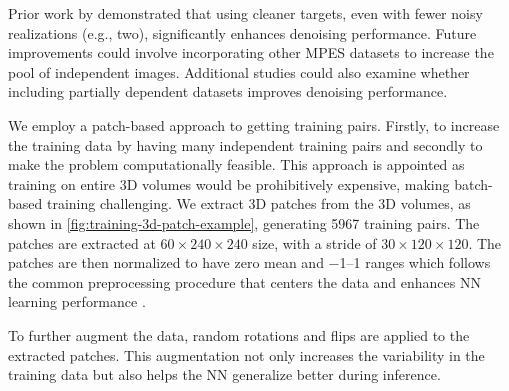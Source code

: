 Prior work by \citeauthor{lehtinenNoise2NoiseLearningImage2018} demonstrated that using cleaner targets, even with fewer noisy realizations (e.g., two), significantly enhances denoising performance. Future improvements could involve incorporating other \gls{MPES} datasets to increase the pool of independent images. Additional studies could also examine whether including partially dependent datasets improves denoising performance.

We employ a \gls{patch}-based approach to getting training pairs. Firstly, to increase the training data by having many independent training pairs and secondly to make the problem computationally feasible. This approach is appointed as training on entire 3D volumes would be prohibitively expensive, making batch-based training challenging. We extract 3D patches from the 3D volumes, as shown in \cref{fig:training-3d-patch-example}, generating \num{5967} training pairs. The patches are extracted at $60 \times 240 \times 240$ size, with a stride of $30 \times 120 \times 120$. The patches are then normalized to have zero mean and \numrange{-1}{1} ranges which follows the common preprocessing procedure that centers the data and enhances \gls{NN} learning performance \cite{bishopDeepLearningFoundations2024}. 

To further augment the data, random rotations and flips are applied to the extracted patches. This augmentation not only increases the variability in the training data but also helps the \gls{NN} generalize better during inference.

